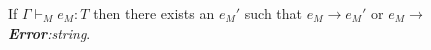 \begin{mpst}
If $\Gamma\vdash_{M}e_{M}:T$ then there exists an $e_{M}'$ such that $e_{M}\rightarrow e_{M}'$ or $e_{M}\rightarrow$ \emph{\textbf{Error}:\;string}.
\end{mpst}
